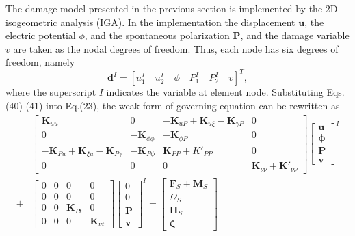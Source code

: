 \documentclass[times,fleqn,11pt]{elsarticle}
\begin{document}
The damage model presented in the previous section is implemented by the 2D isogeometric analysis (IGA). In the implementation the displacement $\mathbf{u}$, the electric potential $\phi$, and the spontaneous polarization $\mathbf{P}$, and the damage variable $v$ are taken as the nodal degrees of freedom. Thus, each node has six degrees of freedom, namely
\begin{equation}
    \mathbf{d}^I=\left[ u_1^I\quad u_2^I\quad \phi\quad P_1^I\quad P_2^I\quad v \right]^T,
\end{equation}
where the superscript $I$ indicates the variable at element node. 
Substituting Eqs.(40)-(41) into Eq.(23), the weak form of governing equation can be rewritten as 
\begin{equation}
\begin{split}
        &\begin{bmatrix}
            \mathbf{K}_{uu} & 0 & -\mathbf{K}_{uP}+\mathbf{K}_{u\xi}-\mathbf{K}_{\gamma P} & 0 \\
            0 & -\mathbf{K}_{\phi\phi} & -\mathbf{K}_{\phi P} & 0 \\
            -\mathbf{K}_{Pu}+\mathbf{K}_{\xi u}-\mathbf{K}_{P \gamma} & -\mathbf{K}_{P\phi } & \mathbf{K}_{PP}+K'_{PP} & 0 \\
            0 & 0 & 0 & \mathbf{K}_{\nu\nu}+\mathbf{K}'_{\nu\nu}
        \end{bmatrix}
        \begin{bmatrix}
            \mathbf{u}\\ \mathbf{\phi} \\ \mathbf{P} \\ \mathbf{v}
        \end{bmatrix}^I \\
       + &
        \begin{bmatrix}
            0 & 0 & 0 & 0 \\
            0 & 0 & 0 & 0 \\
            0 & 0 & \mathbf{K}_{Pt} & 0 \\
            0 & 0 & 0 & \mathbf{K}_{\nu t} 
        \end{bmatrix}
        \begin{bmatrix}
            0\\ 0 \\ \dot{\mathbf{P}} \\ \dot{\mathbf{v}}
        \end{bmatrix}^I
        =
        \begin{bmatrix}
            \mathbf{F}_S+\mathbf{M}_S \\
            {\Omega}_S \\
            \mathbf{\Pi}_S \\
            \mathbf{\zeta}
        \end{bmatrix}
\end{split}
\end{equation}
\end{document}
